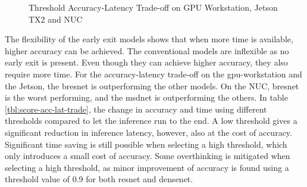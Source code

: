 \begin{figure}
	\caption[Threshold Accuracy-Latency Trade-off]{Threshold Accuracy-Latency Trade-off on \protect{} GPU Workstation, \protect{} Jetson TX2 and \protect{} NUC }
	\label{fig:threshold-acc-lat-trade-off-by-time}
\end{figure}

The flexibility of the early exit models shows that when more time is available, higher accuracy can be achieved. The conventional models are inflexible as no early exit is present. Even though they can achieve higher accuracy, they also require more time.
For the accuracy-latency trade-off on the \gls{gpu}-workstation and the Jetson, the \gls{bresnet} is outperforming the other models. On the NUC, \gls{bresnet} is the worst performing, and the \gls{msdnet} is outperforming the others. In table \ref{tbl:score-acc-lat-trade}, the change in accuracy and time using different thresholds compared to let the inference run to the end.
A low threshold gives a significant reduction in inference latency, however, also at the cost of accuracy. Significant time saving is still possible when selecting a high threshold, which only introduces a small cost of accuracy. Some overthinking is mitigated when selecting a high threshold, as minor improvement of accuracy is found using a threshold value of 0.9 for both \gls{resnet} and \gls{densenet}.
